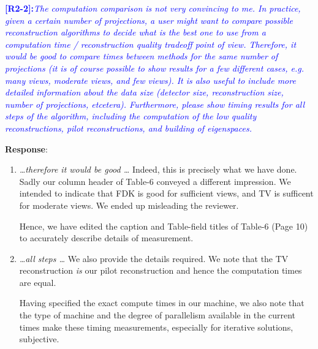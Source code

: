 \documentclass{article}
\begin{document}
\textcolor{blue}{\textbf{[R2-2]:}\textit{The computation comparison is
    not very convincing to me. In practice, given a certain number of
    projections, a user might want to compare possible reconstruction
    algorithms to decide what is the best one to use from a
    computation time / reconstruction quality tradeoff point of
    view. Therefore, it would be good to compare times between methods
    for the same number of projections (it is of course possible to
    show results for a few different cases, e.g. many views, moderate
    views, and few views). It is also useful to include more detailed
    information about the data size (detector size, reconstruction
    size, number of projections, etcetera). Furthermore, please show
    timing results for all steps of the algorithm, including the
    computation of the low quality reconstructions, pilot
    reconstructions, and building of eigenspaces.}} 

\textbf{Response}:

\begin{enumerate}

\item \emph{ \ldots therefore it would be good \ldots } Indeed, this
  is precisely what we have done.  Sadly our column header of Table-6
  conveyed a different impression. We intended to indicate that FDK is
  good for sufficient views, and TV is sufficent for moderate
  views. We ended up misleading the reviewer.
  
  Hence, we have edited the caption and Table-field titles of Table-6
  (Page 10) to accurately describe details of measurement. 

\item \emph{ \ldots all steps \ldots} We also provide the details
  required.  We note that the TV reconstruction \emph{is} our pilot
  reconstruction and hence the computation times are equal.

  Having specified the exact compute times in our machine, we also
  note that the type of machine and the degree of parallelism
  available in the current times make these timing measurements,
  especially for iterative solutions, subjective.

\end{enumerate}
\end{document}
